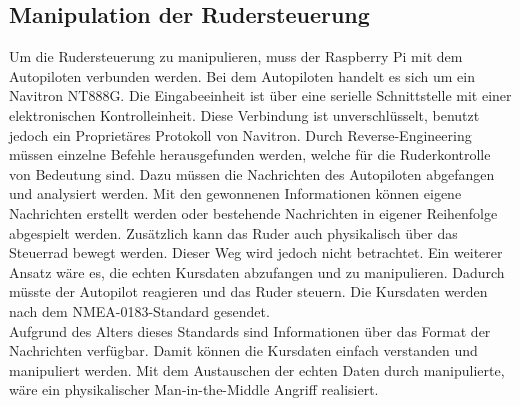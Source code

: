 \subsection{Manipulation der Rudersteuerung} \label{sec:manipulationRuder}
Um die Rudersteuerung zu manipulieren, muss der Raspberry Pi mit dem Autopiloten verbunden werden. Bei dem Autopiloten
handelt es sich um ein Navitron NT888G. Die Eingabeeinheit ist über eine serielle Schnittstelle mit einer elektronischen Kontrolleinheit. 
Diese Verbindung ist unverschlüsselt, benutzt jedoch ein Proprietäres Protokoll von Navitron.
Durch Reverse-Engineering müssen einzelne Befehle herausgefunden werden, welche für die Ruderkontrolle von Bedeutung sind.
Dazu müssen die Nachrichten des Autopiloten abgefangen und analysiert werden. Mit den gewonnenen Informationen können
eigene Nachrichten erstellt werden oder bestehende Nachrichten in eigener Reihenfolge abgespielt werden.
Zusätzlich kann das Ruder auch physikalisch über das Steuerrad bewegt werden. Dieser Weg wird jedoch nicht betrachtet.
Ein weiterer Ansatz wäre es, die echten Kursdaten abzufangen und zu manipulieren. Dadurch müsste der Autopilot reagieren
und das Ruder steuern. Die Kursdaten werden nach dem NMEA-0183-Standard gesendet. \\
Aufgrund des Alters dieses Standards sind Informationen über das Format der Nachrichten verfügbar. Damit können die Kursdaten
einfach verstanden und manipuliert werden. Mit dem Austauschen der echten Daten durch manipulierte, wäre ein 
physikalischer Man-in-the-Middle Angriff realisiert.\\

